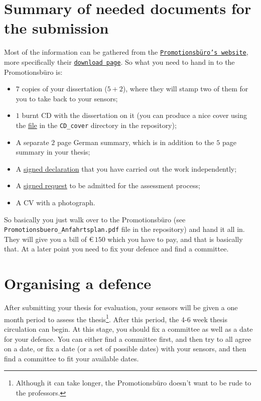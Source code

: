 \documentclass[a4paper]{article}
\begin{document}
    
    \section*{Summary of needed documents for the submission}
        Most of the information can be gathered from the \href{https://www.uni-frankfurt.de/42800906/startseite}{\texttt{Promotionsb\"uro's website}}, more specifically their \href{https://www.uni-frankfurt.de/42800991/downloads}{\texttt{download page}}.
        So what you need to hand in to the Promotionsb\"uro is:
        \begin{itemize}
            \item $7$ copies of your dissertation ($5 + 2$), where they will stamp two of them for you to take back to your sensors;
            \item $1$ burnt CD with the dissertation on it (you can produce a nice cover using the \href{run:Cover.tex}{file} in the \texttt{CD\_cover} directory in the repository);
            \item A separate $2$ page German summary, which is in addition to the $5$ page summary in your thesis;
            \item A \href{run:Erlaerung_Formular.pdf}{signed declaration} that you have carried out the work independently;
            \item A \href{run:Antrag_Formular.pdf}{signed request} to be admitted for the assessment process;
            \item A CV with a photograph.
        \end{itemize}
        So basically you just walk over to the Promotionsb\"uro (see \texttt{Promotionsbuero\_Anfahrtsplan.pdf} file in the repository) and hand it all in.
        They will give you a bill of \euro$\,150$ which you have to pay, and that is basically that.
        At a later point you need to fix your defence and find a committee.

    \section*{Organising a defence}
      After submitting your thesis for evaluation, your sensors will be given a
      one month period to assess the thesis\footnote{Although it can take
        longer, the Promotionsb\"uro doesn't want to be rude to the
        professors.}. After this period, the 4-6 week thesis circulation can
      begin. At this stage, you should fix a committee as well as a date
      for your defence. You can either find a committee first, and then try to
      all agree on a date, or fix a date (or a set of possible dates) with your
      sensors, and then find a committee to fit your available dates.
\end{document}
